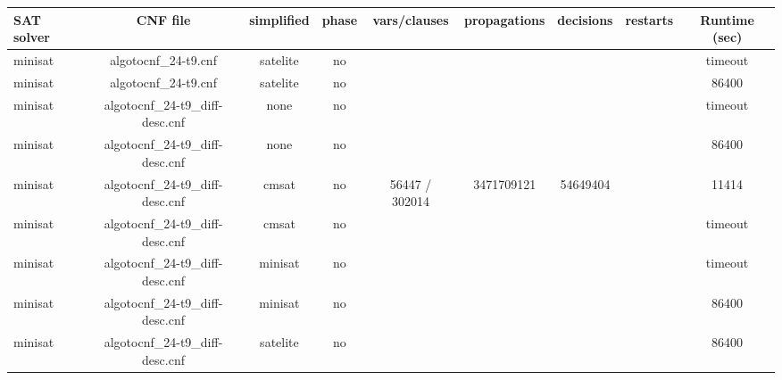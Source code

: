 \begin{appendices}
\begin{table}[p]
  \begin{center}
    \begin{tabular}{l|cccccccc}
        \textbf{SAT solver} & \textbf{CNF file} & \textbf{simplified} & \textbf{phase} & \textbf{vars/clauses} & \textbf{propagations} & \textbf{decisions} & \textbf{restarts} & \textbf{Runtime (sec)} \\
      \hline
  minisat                        & algotocnf\_24-t9.cnf           & satelite   & no    &            &           &           &            & timeout \\ %
  minisat                        & algotocnf\_24-t9.cnf           & satelite   & no    &            &           &           &            & 86400 \\ %
  minisat                        & algotocnf\_24-t9\_diff-desc.cnf & none       & no    &            &           &           &            & timeout \\ %
  minisat                        & algotocnf\_24-t9\_diff-desc.cnf & none       & no    &            &           &           &            & 86400 \\ %
  minisat                        & algotocnf\_24-t9\_diff-desc.cnf & cmsat      & no    & 56447 / 302014 & 3471709121 & 54649404  &            & 11414 \\ %
  minisat                        & algotocnf\_24-t9\_diff-desc.cnf & cmsat      & no    &            &           &           &            & timeout \\ %
  minisat                        & algotocnf\_24-t9\_diff-desc.cnf & minisat    & no    &            &           &           &            & timeout \\ %
  minisat                        & algotocnf\_24-t9\_diff-desc.cnf & minisat    & no    &            &           &           &            & 86400 \\ %
  minisat                        & algotocnf\_24-t9\_diff-desc.cnf & satelite   & no    &            &           &           &            & 86400 \\ %

\end{tabular}
\end{center}
\end{table}
\end{appendices}
